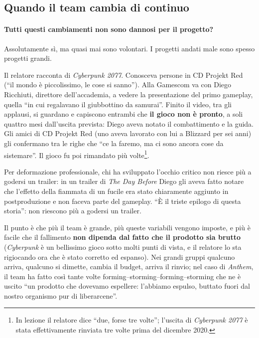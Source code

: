 \subsection{Quando il team cambia di continuo}

\paragraph{Tutti questi cambiamenti non sono dannosi per il progetto?}
Assolutamente sì, ma quasi mai sono volontari. I progetti andati male sono
spesso progetti grandi.

Il relatore racconta di \emph{Cyberpunk 2077}. Conosceva persone in CD
Projekt Red (``il mondo è piccolissimo, le cose si sanno''). Alla Gamescom va
con Diego Ricchiuti, direttore dell'accademia, a vedere la presentazione del
primo gameplay, quella ``in cui regalavano il giubbottino da samurai''.
Finito il video, tra gli applausi, si guardano e capiscono entrambi che
\textbf{il gioco non è pronto}, a soli quattro mesi dall'uscita prevista:
Diego aveva notato il combattimento e la guida. Gli amici di CD Projekt Red
(uno aveva lavorato con lui a Blizzard per sei anni) gli confermano tra le
righe che ``ce la faremo, ma ci sono ancora cose da sistemare''. Il gioco fu
poi rimandato più volte\footnote{In lezione il relatore dice ``due, forse
tre volte''; l'uscita di \emph{Cyberpunk 2077} è stata effettivamente
rinviata tre volte prima del dicembre 2020.}.

Per deformazione professionale, chi ha sviluppato l'occhio critico non
riesce più a godersi un trailer: in un trailer di \emph{The Day Before} Diego
gli aveva fatto notare che l'effetto della fiammata di un fucile era stato
chiaramente aggiunto in postproduzione e non faceva parte del gameplay. ``È
il triste epilogo di questa storia'': non riescono più a godersi un trailer.

Il punto è che più il team è grande, più queste variabili vengono imposte, e
più è facile che il fallimento \textbf{non dipenda dal fatto che il prodotto
sia brutto} (\emph{Cyberpunk} è un bellissimo gioco sotto molti punti di
vista, e il relatore lo sta rigiocando ora che è stato corretto ed espanso).
Nei grandi gruppi qualcuno arriva, qualcuno si dimette, cambia il budget,
arriva il rinvio; nel caso di \emph{Anthem}, il team ha fatto così tante volte
forming--storming--forming--storming che ne è uscito ``un prodotto che
dovevamo espellere: l'abbiamo espulso, buttato fuori dal nostro organismo pur
di liberarcene''.

